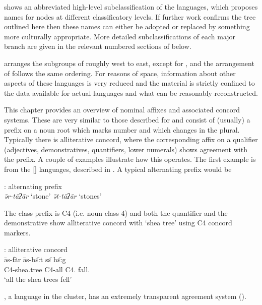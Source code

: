 \documentclass[output=paper]{langsci/langscibook}
\begin{document}
 shows an abbreviated high-level subclassification of the  languages, which proposes names for nodes at different classificatory levels. If further work confirms the tree outlined here then these names can either be adopted or replaced by something more culturally appropriate. More detailed subclassifications of each major branch are given in the relevant numbered sections of  below.

 arranges the subgroups of  roughly west to east, except for , and the arrangement of  follows the same ordering. For reasons of space, information about other aspects of these languages is very reduced and the material is strictly confined to the data available for actual languages and what can be reasonably reconstructed.

This chapter  provides an overview of  nominal affixes and associated concord systems. These are very similar to those described for  and consist of (usually) a prefix on a noun root which marks number and which changes in the plural. Typically there is alliterative concord, where the corresponding affix on a qualifier (adjectives, demonstratives, quantifiers, lower numerals) shows agreement with the prefix. A couple of examples illustrate how this operates. The first example is from the  [] languages, described in \citet{Smith2007}. A typical alternating prefix would be 



\ea
{: alternating prefix}\\  
\textit{ə̄r-tāʔār}	  ‘stone’ \qquad	  \textit{ə̄t-tāʔār}	  ‘stones’\\ 
\z

The class prefix is C4 (i.e. noun class 4) and both the quantifier and the demonstrative show alliterative concord with ‘shea tree’ using C4 concord markers.

\ea 
{: alliterative concord}\\
\gll ə̄s-fàr	ə̄s-bɛ̄:t sɛ̄	hɛ̄:g\\
C4-shea.tree	 C4-all	 C4.\DEM{}	 fall.\PST{}\\
\glt ‘all the shea trees fell’\\  
\z

, a language in the  cluster, has an extremely transparent agreement system (\citealt{McGill2007}).
\end{document}
